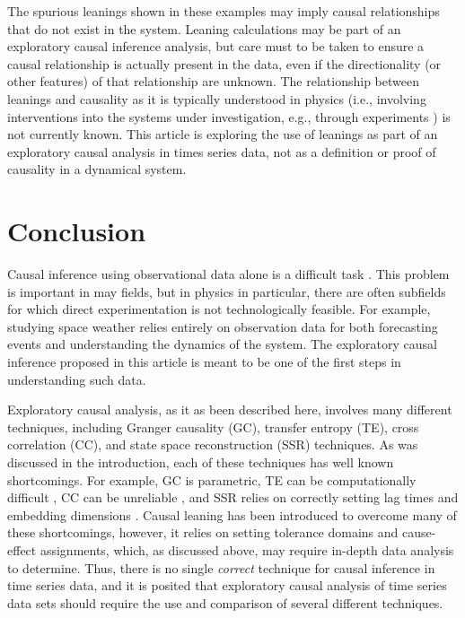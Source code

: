 \documentclass[a4paper,11pt,twocolumn]{article}
\begin{document}
The spurious leanings shown in these examples may imply causal relationships that do not exist in the system.  Leaning calculations may be part of an exploratory causal inference analysis, but care must to be taken to ensure a causal relationship is actually present in the data, even if the directionality (or other features) of that relationship are unknown.  The relationship between leanings and causality as it is typically understood in physics (i.e., involving interventions into the systems under investigation, e.g., through experiments \cite{Pearl2000}) is not currently known.  This article is exploring the use of leanings as part of an exploratory causal analysis in times series data, not as a definition or proof of causality in a dynamical system.   

\section{Conclusion}
Causal inference using observational data alone is a difficult task \cite{kleinberg2012}.  This problem is important in may fields, but in physics in particular, there are often subfields for which direct experimentation is not technologically feasible.  For example, studying space weather relies entirely on observation data for both forecasting events and understanding the dynamics of the system.  The exploratory causal inference proposed in this article is meant to be one of the first steps in understanding such data.  

Exploratory causal analysis, as it as been described here, involves many different techniques, including Granger causality (GC), transfer entropy (TE), cross correlation (CC), and state space reconstruction (SSR) techniques.  As was discussed in the introduction, each of these techniques has well known shortcomings.  For example, GC is parametric, TE can be computationally difficult \cite{kaiser2002}, CC can be unreliable \cite{Rogosa1980}, and SSR relies on correctly setting lag times and embedding dimensions \cite{Small2004}.  Causal leaning has been introduced to overcome many of these shortcomings, however, it relies on setting tolerance domains and cause-effect assignments, which, as discussed above, may require in-depth data analysis to determine.  Thus, there is no single {\em correct} technique for causal inference in time series data, and it is posited that exploratory causal analysis of time series data sets should require the use and comparison of several different techniques.
\end{document}
